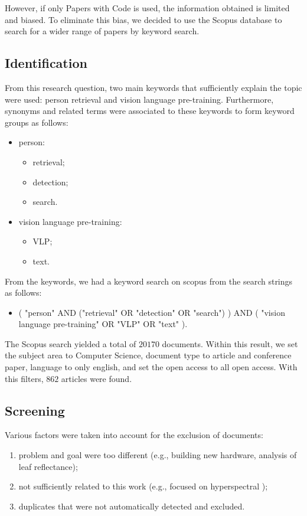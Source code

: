However, if only Papers with Code is used, the information obtained is limited and biased. To eliminate this bias, we decided to use the Scopus database to search for a wider range of papers by keyword search.

\subsection*{Identification}
From this research question, two main keywords that sufficiently explain the topic were used: person retrieval and vision language pre-training.
Furthermore, synonyms and related terms were associated to these keywords to form keyword groups as follows:

\begin{itemize}
    \item person:
    \begin{itemize}
        \item retrieval;
        \item detection;
        \item search.
    \end{itemize}
    \item vision language pre-training:
    \begin{itemize}
        \item VLP;
        \item text.
    \end{itemize}
\end{itemize}


From the keywords, we had a keyword search on scopus from the search strings as follows:

\begin{itemize}
    \item ( "person" AND ("retrieval" OR "detection" OR "search") ) AND ( "vision language pre-training" OR "VLP" OR "text" ).
\end{itemize}

The Scopus search yielded a total of $20170$ documents. Within this result, we set the subject area to Computer Science, document type to article and conference paper, language to only english, and set the open access to all open access. With this filters, $862$ articles were found. 

\subsection{Screening}

Various factors were taken into account for the exclusion of documents:
\begin{enumerate}
    \item problem and goal were too different (e.g., building new hardware, analysis of leaf reflectance);
    \item not sufficiently related to this work (e.g., focused on hyperspectral );
    \item duplicates that were not automatically detected and excluded.
\end{enumerate}

